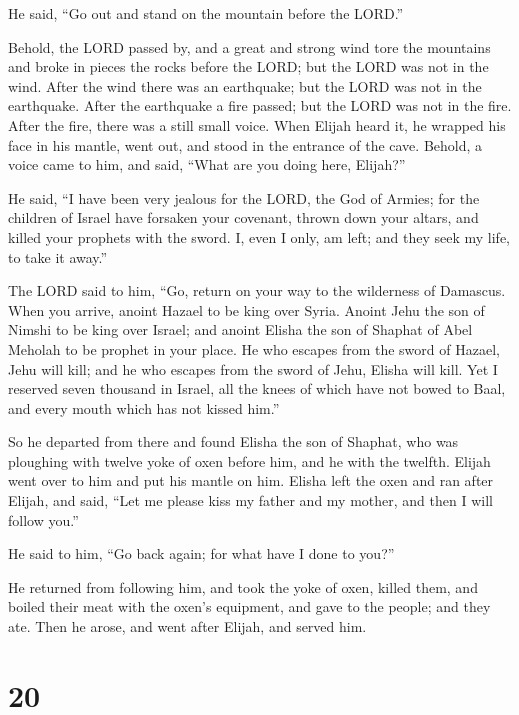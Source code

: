  He said, ``Go out and stand on the mountain before the
LORD.''

Behold, the LORD passed by, and a great and strong wind tore the
mountains and broke in pieces the rocks before the LORD; but the LORD
was not in the wind. After the wind there was an earthquake; but the
LORD was not in the earthquake.  After the earthquake a
fire passed; but the LORD was not in the fire. After the fire, there was
a still small voice.  When Elijah heard it, he wrapped his
face in his mantle, went out, and stood in the entrance of the cave.
Behold, a voice came to him, and said, ``What are you doing here,
Elijah?''

 He said, ``I have been very jealous for the LORD, the God
of Armies; for the children of Israel have forsaken your covenant,
thrown down your altars, and killed your prophets with the sword. I,
even I only, am left; and they seek my life, to take it away.''

 The LORD said to him, ``Go, return on your way to the
wilderness of Damascus. When you arrive, anoint Hazael to be king over
Syria.  Anoint Jehu the son of Nimshi to be king over
Israel; and anoint Elisha the son of Shaphat of Abel Meholah to be
prophet in your place.  He who escapes from the sword of
Hazael, Jehu will kill; and he who escapes from the sword of Jehu,
Elisha will kill.  Yet I reserved seven thousand in Israel,
all the knees of which have not bowed to Baal, and every mouth which has
not kissed him.''

 So he departed from there and found Elisha the son of
Shaphat, who was ploughing with twelve yoke of oxen before him, and he
with the twelfth. Elijah went over to him and put his mantle on him.
 Elisha left the oxen and ran after Elijah, and said, ``Let
me please kiss my father and my mother, and then I will follow you.''

He said to him, ``Go back again; for what have I done to you?''

 He returned from following him, and took the yoke of oxen,
killed them, and boiled their meat with the oxen's equipment, and gave
to the people; and they ate. Then he arose, and went after Elijah, and
served him.

\hypertarget{section-19}{%
\section{20}\label{section-19}}

